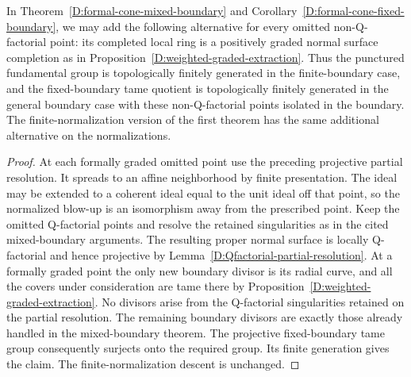 \begin{corollary}
\label{D:weighted-graded-boundary}
In Theorem~\ref{D:formal-cone-mixed-boundary} and
Corollary~\ref{D:formal-cone-fixed-boundary}, we may add the
following alternative for every omitted non-Q-factorial point:
its completed local ring is a positively graded normal surface
completion as in Proposition~\ref{D:weighted-graded-extraction}.
Thus the punctured fundamental group is topologically finitely
generated in the finite-boundary case, and the fixed-boundary
tame quotient is topologically finitely generated in the general
boundary case with these non-Q-factorial points isolated in the
boundary.  The finite-normalization version of the first theorem
has the same additional alternative on the normalizations.
\end{corollary}
\begin{proof}
At each formally graded omitted point use the preceding
projective partial resolution.  It spreads to an affine
neighborhood by finite presentation.  The ideal may be extended
to a coherent ideal equal to the unit ideal off that point, so
the normalized blow-up is an isomorphism away from the prescribed
point.  Keep the omitted Q-factorial points and resolve the
retained singularities as in the cited mixed-boundary arguments.
The resulting proper normal surface is locally Q-factorial and
hence projective by Lemma~\ref{D:Qfactorial-partial-resolution}.
At a formally graded point the only new boundary divisor is its
radial curve, and all the covers under consideration are tame
there by Proposition~\ref{D:weighted-graded-extraction}.  No
divisors arise from the Q-factorial singularities retained on
the partial resolution.  The remaining boundary divisors are
exactly those already handled in the mixed-boundary theorem.
The projective fixed-boundary tame group consequently surjects
onto the required group.  Its finite generation gives the claim.
The finite-normalization descent is unchanged.
\end{proof}
